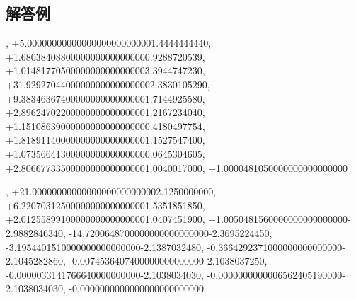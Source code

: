 \documentclass{article}
\begin{document}
\subsection{\textbf{解答例}}
\begin{maplegroup}
\begin{mapleinput}
\end{mapleinput}
\mapleresult
\begin{maplelatex}
\end{maplelatex}
\mapleresult
\begin{maplelatex}
\end{maplelatex}
\mapleresult
{}
\end{maplegroup}
\begin{maplegroup}
\begin{mapleinput}
\end{mapleinput}
, +5.00000000000000000000000001.4444444440, +1.68038408800000000000000000.9288720539, +1.01481770500000000000000003.3944747230, +31.92927044000000000000000002.3830105290, +9.38346367400000000000000001.7144925580, +2.89624702200000000000000001.2167234040, +1.15108639000000000000000000.4180497754, +1.81891140000000000000000001.1527547400, +1.07356641300000000000000000.0645304605, +2.80667733500000000000000001.0040017000, +1.0000481050000000000000000
\end{maplegroup}
\begin{maplegroup}
\begin{mapleinput}
\end{mapleinput}
, +21.00000000000000000000000002.1250000000, +6.22070312500000000000000001.5351851850, +2.01255899100000000000000001.0407451900, +1.0050481560000000000000000-2.9882846340, -14.7200648700000000000000000-2.3695224450, -3.1954401510000000000000000-2.1387032480, -0.3664292371000000000000000-2.1045282860, -0.0074536407400000000000000-2.1038037250, -0.0000033141766640000000000-2.1038034030, -0.0000000000006562405190000-2.1038034030, -0.0000000000000000000000000
\end{maplegroup}
\end{document}
